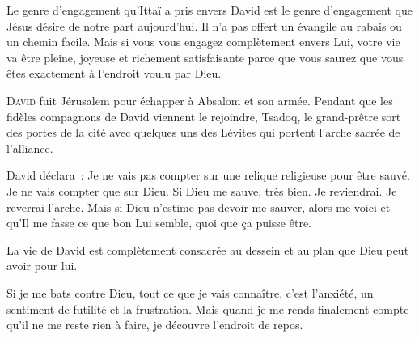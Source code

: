 Le genre d'engagement qu'Ittaï a pris envers David est le genre d'engagement
 que Jésus désire de notre part aujourd'hui.
 Il n'a pas offert un évangile au rabais ou un chemin facile.
 Mais si vous vous engagez complètement envers Lui, votre vie va être pleine,
 joyeuse et richement satisfaisante \ocadr parce que vous saurez
 que vous êtes exactement à l'endroit voulu par Dieu. 

\dvrule






\lettrine{D}{avid} fuit Jérusalem pour échapper à Absalom et son armée.
 Pendant que les fidèles compagnons de David viennent le rejoindre,
 Tsadoq, le grand-prêtre sort des portes de la cité avec quelques uns
 des Lévites qui portent l'arche sacrée de l'alliance. 

David déclara~:
 \og Je ne vais pas compter sur une relique religieuse pour être sauvé.
 Je ne vais compter que sur Dieu. Si Dieu me sauve, très bien. Je reviendrai.
 Je reverrai l'arche. Mais si Dieu n'estime pas devoir me sauver,
 alors me voici et qu'Il me fasse ce que bon Lui semble,
 quoi que ça puisse être. \fg{}

La vie de David est complètement consacrée au dessein
 et au plan que Dieu peut avoir pour lui. 


Si je me bats contre Dieu, tout ce que je vais connaître, c'est l'anxiété,
 un sentiment de futilité et la frustration.
 Mais quand je me rends finalement compte qu'il ne me reste rien à faire,
 je découvre l'endroit de repos. 

